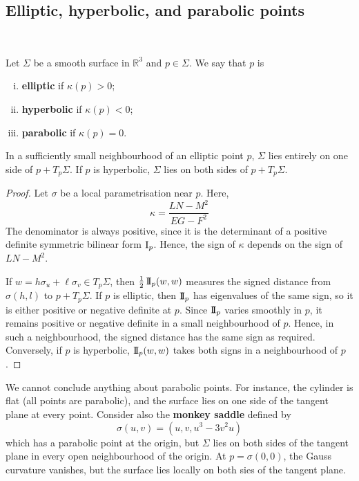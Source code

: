 \documentclass[a4paper,11pt]{article}
\begin{document}
\subsection{Elliptic, hyperbolic, and parabolic points}
\ \vspace*{-1.5em}
\begin{definition}
	Let \( \Sigma \) be a smooth surface in \( \mathbb R^3 \) and \( p \in \Sigma \).
	We say that \( p \) is
	\begin{enumerate}[(i)]
		\item \textbf{elliptic} if \( \kappa(p) > 0 \);
		\item \textbf{hyperbolic} if \( \kappa(p) < 0 \);
		\item \textbf{parabolic} if \( \kappa(p) = 0 \).
	\end{enumerate}
\end{definition}
\begin{lemma}
	In a sufficiently small neighbourhood of an elliptic point \( p \), \( \Sigma \) lies entirely on one side of \( p + T_p \Sigma \).
	If \( p \) is hyperbolic, \( \Sigma \) lies on both sides of \( p + T_p \Sigma \).
\end{lemma}
\begin{proof}
	Let \( \sigma \) be a local parametrisation near \( p \).
	Here,
	\[
		\kappa = \frac{LN-M^2}{EG-F^2}
	\]
	The denominator is always positive, since it is the determinant of a positive definite symmetric bilinear form \( \operatorname{\mathrm{I}}_p \).
	Hence, the sign of \( \kappa \) depends on the sign of \( LN-M^2 \).

	If \( w = h \sigma_u + \ell \sigma_v \in T_p \Sigma \), then \( \frac{1}{2} \operatorname{\mathrm{I\!I}}_p(w,w) \) measures the signed distance from \( \sigma(h,l) \) to \( p + T_p \Sigma \).
	If \( p \) is elliptic, then \( \operatorname{\mathrm{I\!I}}_p \) has eigenvalues of the same sign, so it is either positive or negative definite at \( p \).
	Since \( \operatorname{\mathrm{I\!I}}_p \) varies smoothly in \( p \), it remains positive or negative definite in a small neighbourhood of \( p \).
	Hence, in such a neighbourhood, the signed distance has the same sign as required.
	Conversely, if \( p \) is hyperbolic, \( \operatorname{\mathrm{I\!I}}_p(w,w) \) takes both signs in a neighbourhood of \( p \).
\end{proof}

\begin{remark}
	We cannot conclude anything about parabolic points.
	For instance, the cylinder is flat (all points are parabolic), and the surface lies on one side of the tangent plane at every point.
	Consider also the \textbf{monkey saddle} defined by
	\[
		\sigma(u,v) = (u,v,u^3 - 3v^2 u)
	\]
	which has a parabolic point at the origin, but \( \Sigma \) lies on both sides of the tangent plane in every open neighbourhood of the origin.
	At \( p = \sigma(0,0) \), the Gauss curvature vanishes, but the surface lies locally on both sies of the tangent plane.
\end{remark}
\end{document}
